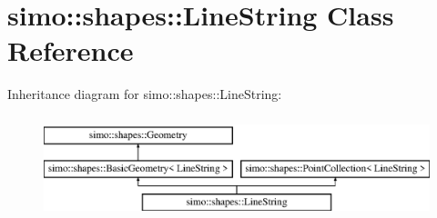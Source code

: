 \hypertarget{classsimo_1_1shapes_1_1_line_string}{\section{simo\-:\-:shapes\-:\-:Line\-String Class Reference}
\label{classsimo_1_1shapes_1_1_line_string}
}
Inheritance diagram for simo\-:\-:shapes\-:\-:Line\-String\-:\begin{figure}[H]
\begin{center}
\leavevmode
\includegraphics[height=3.000000cm]{classsimo_1_1shapes_1_1_line_string}
\end{center}
\end{figure}
